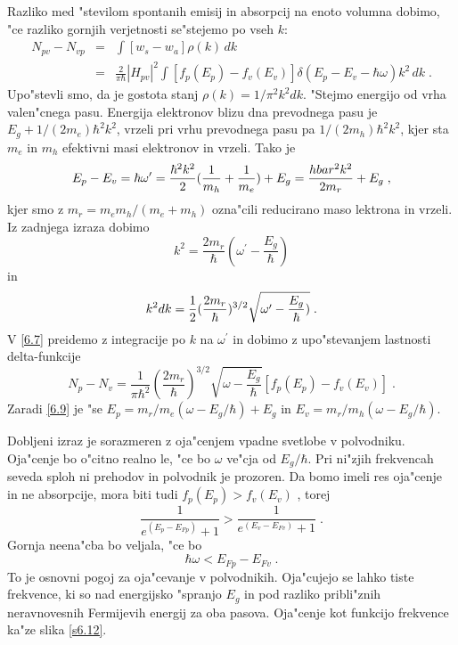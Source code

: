 Razliko med "stevilom spontanih emisij in absorpcij na enoto volumna dobimo,
"ce razliko gornjih verjetnosti se"stejemo po vseh $k$: 
\begin{eqnarray}  \label{6.7}
N_{pv}-N_{vp}&=&\int[w_s-w_a]\rho(k)\,dk  \nonumber \\
&=&\frac{2}{\pi\hbar}|H_{pv}|^2 \int[f_p(E_p)-f_v(E_v)]
\delta(E_p-E_v-\hbar\omega) k^2\,dk\;.
\end{eqnarray}
Upo"stevli smo, da je gostota stanj $\rho(k)=1/\pi^2 k^2dk$. "Stejmo
energijo od vrha valen"cnega pasu. Energija elektronov blizu dna prevodnega
pasu je $E_g+1/(2m_e)\hbar^2 k^2$, vrzeli pri vrhu prevodnega pasu pa $%
1/(2m_h)\hbar^2 k^2$, kjer sta $m_e$ in $m_h$ efektivni masi elektronov in
vrzeli. Tako je 
\begin{equation}  \label{6.8}
E_p-E_v=\hbar\omega^{\prime}=\frac{\hbar^2 k^2}{2}(\frac{1}{m_h}+ \frac{1}{%
m_e})+E_g=\frac{hbar^2 k^2}{2m_r}+E_g\;,
\end{equation}
kjer smo z $m_r=m_e m_h/(m_e+m_h)$ ozna"cili reducirano maso lektrona in
vrzeli. Iz zadnjega izraza dobimo 
\begin{equation}  \label{6.9}
k^2=\frac{2m_r}{\hbar}(\omega^{\prime}-\frac{E_g}{\hbar})
\end{equation}
in 
\begin{equation}  \label{6.10}
k^2dk=\frac{1}{2}(\frac{2m_r}{\hbar})^{3/2}\sqrt{\omega^{\prime}- \frac{E_g}{%
\hbar})}\;.
\end{equation}
V \ref{6.7} preidemo z integracije po $k$ na $\omega^{\prime}$ in dobimo z
upo"stevanjem lastnosti delta-funkcije 
\begin{equation}  \label{6.11}
N_p-N_v=\frac{1}{\pi\hbar^2}(\frac{2m_r}{\hbar})^{3/2} \sqrt{\omega-\frac{E_g%
}{\hbar}}[f_p(E_p)-f_v(E_v)]\;.
\end{equation}
Zaradi \ref{6.9} je "se $E_p=m_r/m_e(\omega-E_g/\hbar)+E_g$ in $%
E_v=m_r/m_h(\omega-E_g/\hbar)$.

Dobljeni izraz je sorazmeren z oja"cenjem vpadne svetlobe v polvodniku.
Oja"cenje bo o"citno realno le, "ce bo $\omega$ ve"cja od $E_g/\hbar$. Pri
ni"zjih frekvencah seveda sploh ni prehodov in polvodnik je prozoren. Da
bomo imeli res oja"cenje in ne absorpcije, mora biti tudi $f_p(E_p)>f_v(E_v)$%
, torej 
\begin{equation}  \label{6.12}
\frac{1}{e^{(E_p-E_{Fp})}+1}>\frac{1}{e^{(E_v-E_{Fv})}+1}\;.
\end{equation}
Gornja neena"cba bo veljala, "ce bo 
\begin{equation}  \label{6.13}
\hbar\omega<E_{Fp}-E_{Fv}\;.
\end{equation}
To je osnovni pogoj za oja"cevanje v polvodnikih. Oja"cujejo se lahko tiste
frekvence, ki so nad energijsko "spranjo $E_g$ in pod razliko pribli"znih
neravnovesnih Fermijevih energij za oba pasova. Oja"cenje kot funkcijo
frekvence ka"ze slika \ref{s6.12}.

